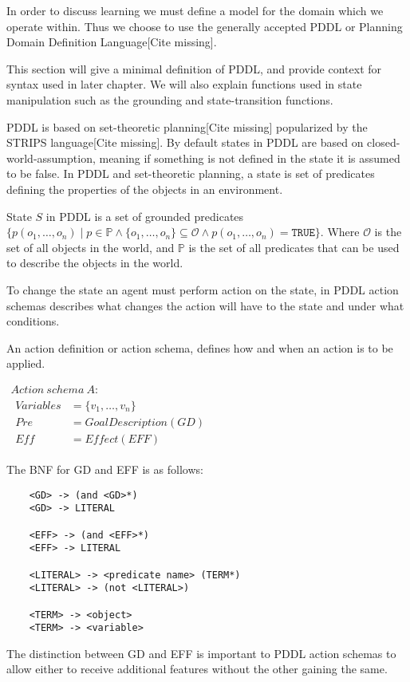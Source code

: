 \documentclass[../Master.tex]{subfiles}
\begin{document}
In order to discuss learning we must define a model for the domain which we operate within. Thus we choose to use the generally accepted PDDL or Planning Domain Definition Language[Cite missing]. 

This section will give a minimal definition of PDDL, and provide context for syntax used in later chapter. We will also explain functions used in state manipulation such as the grounding and state-transition functions.


PDDL is based on set-theoretic planning[Cite missing] popularized by the STRIPS language[Cite missing]. By default states in PDDL are based on closed-world-assumption, meaning if something is not defined in the state it is assumed to be false. 
In PDDL and set-theoretic planning, a state is set of predicates defining the properties of the objects in an environment.

\begin{definition} 
	State $S$ in PDDL is a set of grounded predicates $\{p(o_1,\dots,o_n) \mid  p \in \mathbb{P} \land \{o_1,\dots,o_n\} \subseteq \mathcal{O} \land p(o_1,\dots,o_n) = \texttt{TRUE}\}$. Where $\mathcal{O}$ is the set of all objects in the world, and $\mathbb{P}$ is the set of all predicates that can be used to describe the objects in the world.
\end{definition}

To change the state an agent must perform action on the state, in PDDL action schemas describes what changes the action will have to the state and under what conditions. 

	
\begin{definition} \label{def:lrn:action-spec-def}
		An action definition or action schema, defines how and when an action is to be applied. 
		
		$
		\begin{array}{ll}
		Action ~ schema ~ A: & \\
		
		\begin{array}{ll}
		Variables & = \{v_1,\dots,v_n\}			 \\  
		Pre	& = Goal Description(GD) \\
		Eff & = Effect(EFF) 
		\end{array}
		\end{array}$
		
		The BNF for GD and EFF is as follows:
		
		\begin{lstlisting}
	<GD> -> (and <GD>*) 
	<GD> -> LITERAL
	
	<EFF> -> (and <EFF>*)
	<EFF> -> LITERAL
	
	<LITERAL> -> <predicate name> (TERM*)
	<LITERAL> -> (not <LITERAL>)
	
	<TERM> -> <object>
	<TERM> -> <variable>
		\end{lstlisting}
		
		The distinction between GD and EFF is important to PDDL action schemas to allow either to receive additional features without the other gaining the same.
	\end{definition}
	
\end{document}
